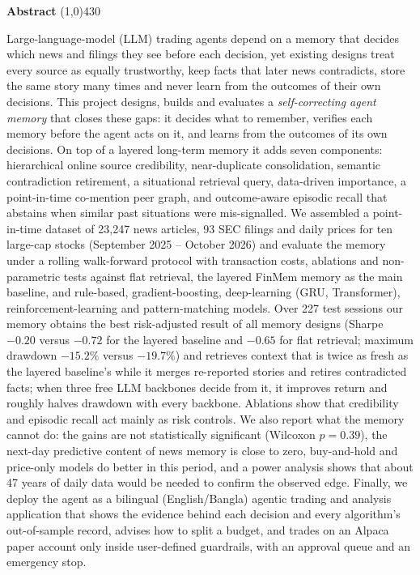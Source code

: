 \setlength{\headheight}{14pt}
\begin{center}
	{\huge \bf Abstract}
	\line(1,0){430}
\end{center}

Large-language-model (LLM) trading agents depend on a memory that decides which news and filings they see before each decision, yet existing designs treat every source as equally trustworthy, keep facts that later news contradicts, store the same story many times and never learn from the outcomes of their own decisions. This project designs, builds and evaluates a \emph{self-correcting agent memory} that closes these gaps: it decides what to remember, verifies each memory before the agent acts on it, and learns from the outcomes of its own decisions. On top of a layered long-term memory it adds seven components: hierarchical online source credibility, near-duplicate consolidation, semantic contradiction retirement, a situational retrieval query, data-driven importance, a point-in-time co-mention peer graph, and outcome-aware episodic recall that abstains when similar past situations were mis-signalled. We assembled a point-in-time dataset of 23{,}247 news articles, 93 SEC filings and daily prices for ten large-cap stocks (September 2025 -- October 2026) and evaluate the memory under a rolling walk-forward protocol with transaction costs, ablations and non-parametric tests against flat retrieval, the layered FinMem memory as the main baseline, and rule-based, gradient-boosting, deep-learning (GRU, Transformer), reinforcement-learning and pattern-matching models. Over 227 test sessions our memory obtains the best risk-adjusted result of all memory designs (Sharpe $-0.20$ versus $-0.72$ for the layered baseline and $-0.65$ for flat retrieval; maximum drawdown $-15.2\%$ versus $-19.7\%$) and retrieves context that is twice as fresh as the layered baseline's while it merges re-reported stories and retires contradicted facts; when three free LLM backbones decide from it, it improves return and roughly halves drawdown with every backbone. Ablations show that credibility and episodic recall act mainly as risk controls. We also report what the memory cannot do: the gains are not statistically significant (Wilcoxon $p=0.39$), the next-day predictive content of news memory is close to zero, buy-and-hold and price-only models do better in this period, and a power analysis shows that about 47 years of daily data would be needed to confirm the observed edge. Finally, we deploy the agent as a bilingual (English/Bangla) agentic trading and analysis application that shows the evidence behind each decision and every algorithm's out-of-sample record, advises how to split a budget, and trades on an Alpaca paper account only inside user-defined guardrails, with an approval queue and an emergency stop.
\clearpage
\setlength{\headheight}{12pt}
